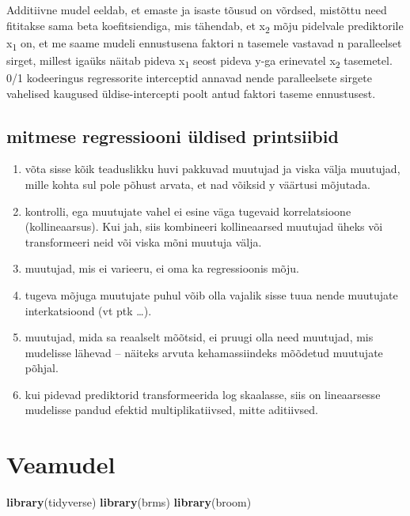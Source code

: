 \documentclass[]{book}
\newenvironment{Shaded}{\begin{snugshade}}{\end{snugshade}}
\newcommand{\KeywordTok}[1]{\textcolor[rgb]{0.13,0.29,0.53}{\textbf{#1}}}
\newcommand{\NormalTok}[1]{#1}
\begin{document}
Additiivne mudel eeldab, et emaste ja isaste tõusud on võrdsed, mistõttu need fititakse sama beta koefitsiendiga, mis tähendab, et x\textsubscript{2} mõju pidelvale prediktorile x\textsubscript{1} on, et me saame mudeli ennustusena faktori n tasemele vastavad n paralleelset sirget, millest igaüks näitab pideva x\textsubscript{1} seost pideva y-ga erinevatel x\textsubscript{2} tasemetel. 0/1 kodeeringus regressorite interceptid annavad nende paralleelsete sirgete vahelised kaugused üldise-intercepti poolt antud faktori taseme ennustusest.

\hypertarget{mitmese-regressiooni-uldised-printsiibid}{%
\section{mitmese regressiooni üldised printsiibid}\label{mitmese-regressiooni-uldised-printsiibid}}

\begin{enumerate}
\def\labelenumi{\arabic{enumi}.}
\item
  võta sisse kõik teaduslikku huvi pakkuvad muutujad ja viska välja muutujad, mille kohta sul pole põhust arvata, et nad võiksid y väärtusi mõjutada.
\item
  kontrolli, ega muutujate vahel ei esine väga tugevaid korrelatsioone (kollineaarsus). Kui jah, siis kombineeri kollineaarsed muutujad üheks või transformeeri neid või viska mõni muutuja välja.
\item
  muutujad, mis ei varieeru, ei oma ka regressioonis mõju.
\item
  tugeva mõjuga muutujate puhul võib olla vajalik sisse tuua nende muutujate interkatsioond (vt ptk \ldots{}).
\item
  muutujad, mida sa reaalselt mõõtsid, ei pruugi olla need muutujad, mis mudelisse lähevad -- näiteks arvuta kehamassiindeks mõõdetud muutujate põhjal.
\item
  kui pidevad prediktorid transformeerida log skaalasse, siis on lineaarsesse mudelisse pandud efektid multiplikatiivsed, mitte aditiivsed.
\end{enumerate}

\hypertarget{veamudel}{%
\chapter{Veamudel}\label{veamudel}}

\begin{Shaded}
\begin{Highlighting}[]
\KeywordTok{library}\NormalTok{(tidyverse)}
\KeywordTok{library}\NormalTok{(brms)}
\KeywordTok{library}\NormalTok{(broom)}
\end{Highlighting}
\end{Shaded}
\end{document}
